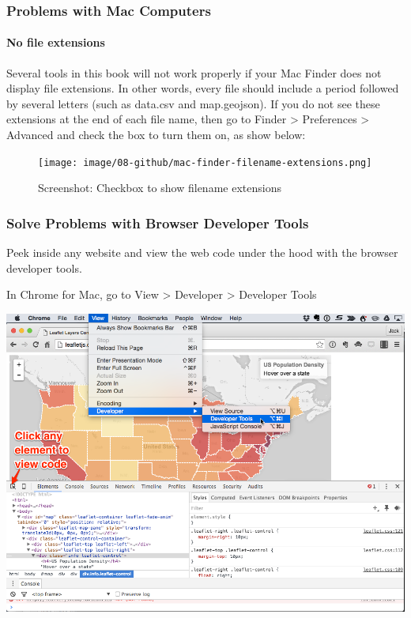\documentclass[
  english,
]{book}
\begin{document}
\hypertarget{problems-with-mac-computers}{%
\subsubsection*{Problems with Mac Computers}\label{problems-with-mac-computers}}

\hypertarget{no-file-extensions}{%
\paragraph{No file extensions}\label{no-file-extensions}}

Several tools in this book will not work properly if your Mac Finder does not display file extensions. In other words, every file should include a period followed by several letters (such as data.csv and map.geojson). If you do not see these extensions at the end of each file name, then go to Finder \textgreater{} Preferences \textgreater{} Advanced and check the box to turn them on, as show below:

\begin{figure}
\centering
\texttt{[image: image/08-github/mac-finder-filename-extensions.png]}
\caption{Screenshot: Checkbox to show filename extensions}
\end{figure}

\hypertarget{solve-problems-with-browser-developer-tools}{%
\subsubsection*{Solve Problems with Browser Developer Tools}\label{solve-problems-with-browser-developer-tools}}

Peek inside any website and view the web code under the hood with the browser developer tools.

In Chrome for Mac, go to View \textgreater{} Developer \textgreater{} Developer Tools

\includegraphics{images/08-github/Chrome-developer-tools.png}
\end{document}
